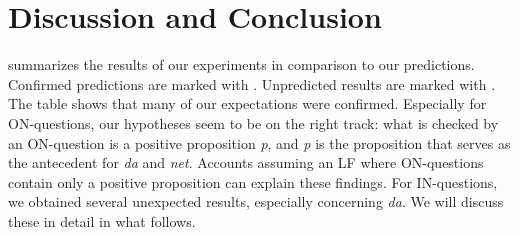 \documentclass[output=paper,colorlinks,citecolor=brown]{langscibook}
\begin{document}
\section{Discussion and Conclusion}\label{geist-repp:sec:Discussion-Conclusion}

 summarizes the results of our experiments in comparison to our predictions. Confirmed predictions are marked with . Unpredicted results are marked with . The table shows that many of our expectations were confirmed. Especially for ON-questions, our hypotheses seem to be on the right track: what is checked by an ON-question is a positive proposition \textit{p}, and \textit{p} is the proposition that serves as the antecedent for \textit{da} and \textit{net}. Accounts assuming an LF where ON-questions contain only a positive proposition can explain these findings. For IN-questions, we obtained several unexpected results, especially concerning \textit{da}. We will discuss these in detail in what follows.\largerpage[-1]\pagebreak

\begin{table}
\caption{Results and predictions}
\label{geist-repp:tab:ResultsAndPredictions}
\end{table}
\end{document}
